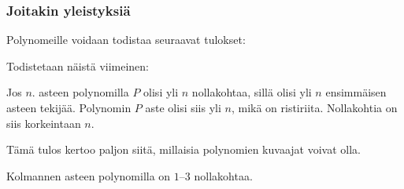 
\subsubsection*{Joitakin yleistyksiä}

Polynomeille voidaan todistaa seuraavat tulokset:


Todistetaan näistä viimeinen:

\begin{todistus}
Jos $n$. asteen polynomilla $P$ olisi yli $n$ nollakohtaa, sillä olisi yli $n$ ensimmäisen asteen tekijää. Polynomin $P$ aste olisi siis yli $n$, mikä on ristiriita. Nollakohtia on siis korkeintaan $n$.
\end{todistus}

Tämä tulos kertoo paljon siitä, millaisia polynomien kuvaajat voivat olla.

\begin{esimerkki} Kolmannen asteen polynomilla on $1$--$3$ nollakohtaa.

\begin{lukusuora}{-2.5}{3}{3.6}
\lukusuoraisobbox
{}
\end{lukusuora}
\begin{lukusuora}{-2.8}{2.5}{3.6}
\lukusuoraisobbox
{}
\end{lukusuora}
\begin{lukusuora}{-2}{2}{3.6}
\lukusuoraisobbox
{}
\end{lukusuora}

\end{esimerkki}

